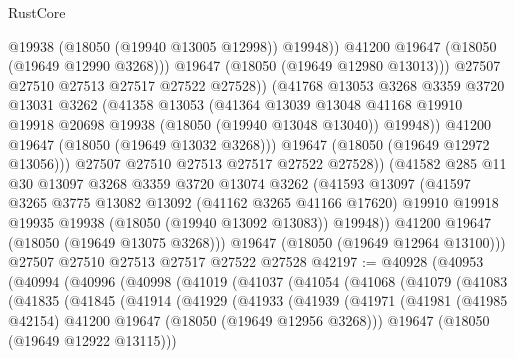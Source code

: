 \begin{lexlean}{RustCore}
\begin{coremodule}
                        @19938
                        (@18050 (@19940 @13005 @12998))
                        @19948))
                    @41200
                    @19647
                    (@18050 (@19649 @12990 @3268)))
                  @19647
                  (@18050 (@19649 @12980 @13013)))
                @27507
                @27510
                @27513
                @27517
                @27522
                @27528))
            (@41768
              @13053
              @3268
              @3359
              @3720
              @13031
              @3262
              (@41358
                @13053
                (@41364
                  @13039
                  @13048
                  @41168
                  @19910
                  @19918
                  @20698
                  @19938
                  (@18050 (@19940 @13048 @13040))
                  @19948))
              @41200
              @19647
              (@18050 (@19649 @13032 @3268)))
            @19647
            (@18050 (@19649 @12972 @13056)))
          @27507
          @27510
          @27513
          @27517
          @27522
          @27528))
      (@41582
        @285
        @11
        @30
        @13097
        @3268
        @3359
        @3720
        @13074
        @3262
        (@41593
          @13097
          (@41597
            @3265
            @3775
            @13082
            @13092
            (@41162 @3265 @41166 @17620)
            @19910
            @19918
            @19935
            @19938
            (@18050 (@19940 @13092 @13083))
            @19948))
        @41200
        @19647
        (@18050 (@19649 @13075 @3268)))
      @19647
      (@18050 (@19649 @12964 @13100)))
    @27507
    @27510
    @27513
    @27517
    @27522
    @27528
@42197 := @40928
    (@40953
      (@40994
        (@40996
          (@40998
            (@41019
              (@41037
                (@41054
                  (@41068
                    (@41079
                      (@41083
                        (@41835
                          (@41845
                            (@41914
                              (@41929
                                (@41933
                                  (@41939
                                    (@41971
                                      (@41981
                                        (@41985 @42154)
                                        @41200
                                        @19647
                                        (@18050 (@19649 @12956 @3268)))
                                      @19647
                                      (@18050 (@19649 @12922 @13115)))

\end{coremodule}
\end{lexlean}
